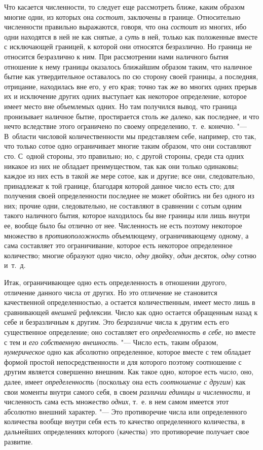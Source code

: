 Что касается численности, то следует еще рассмотреть ближе, каким образом
многие одни, из которых она {\em состоит}, заключены в границе. Относительно
численности правильно выражаются, говоря, что она {\em состоит} из многих, ибо
одни находятся в ней не как снятые, а {\em суть} в ней, только как положенные
вместе с исключающей границей, к которой они относятся безразлично. Но граница
не относится безразлично к ним. При рассмотрении нами наличного бытия отношение
к нему границы оказалось ближайшим образом таким, что наличное бытие как
утвердительное оставалось по сю сторону своей границы, а последняя, отрицание,
находилась вне его, у его края; точно так же во многих одних прерыв их и
исключение других одних выступает как некоторое определение, которое имеет
место вне объемлемых одних. Но там получился вывод, что граница пронизывает
наличное бытие, простирается столь же далеко, как последнее, и что нечто
вследствие этого ограничено по своему определению, т.~е. конечно. "---
В~области числовой количественности мы представляем себе, например, сто так,
что только сотое одно ограничивает многие таким образом, что они составляют
сто. С~одной стороны, это правильно; но, с другой стороны, среди ста одних
никакое из них не обладает преимуществом, так как они только одинаковы; каждое
из них есть в такой же мере сотое, как и другие; все они, следовательно,
принадлежат к той границе, благодаря которой данное число есть сто; для
получения своей определенности последнее не может обойтись ни без одного из
них; прочие одни, следовательно, не составляют в сравнении с сотым одним такого
наличного бытия, которое находилось бы вне границы или лишь внутри ее, вообще
было бы отлично от нее. Численность не есть поэтому некоторое множество в {\em
противоположность} объемлющему, ограничивающему одному, а сама составляет это
ограничивание, которое есть некоторое определенное количество; многие образуют
одно число, {\em одну} двойку, {\em один} десяток, {\em одну} сотню и~т.~д.

Итак, ограничивающее одно есть определенность в отношении другого, отличение
данного числа от других. Но это отличение не становится качественной
определенностью, а остается количественным, имеет место лишь в сравнивающей
{\em внешней} рефлексии. Число как одно остается обращенным назад к себе и
безразличным к другим. Это {\em безразличие} числа к другим есть его
существенное определение; оно составляет его {\em определенность в себе}, но
вместе с тем и {\em его собственную внешность}. "--- Число есть, таким образом,
{\em нумерическое} одно как абсолютно определенное, которое вместе с тем
обладает формой простой непосредственности и для которого поэтому соотношение с
другим является совершенно внешним. Как такое одно, которое есть {\em число},
оно, далее, имеет {\em определенность} (поскольку она есть {\em соотношение с
другим}) как свои моменты внутри самого себя, в своем {\em различии единицы и
численности}, и численность сама есть множество {\em одних}, т.~е. в нем самом
имеется этот абсолютно внешний характер. "--- Это противоречие числа или
определенного количества вообще внутри себя есть то качество определенного
количества, в дальнейших определениях которого (качества) это противоречие
получает свое развитие.

